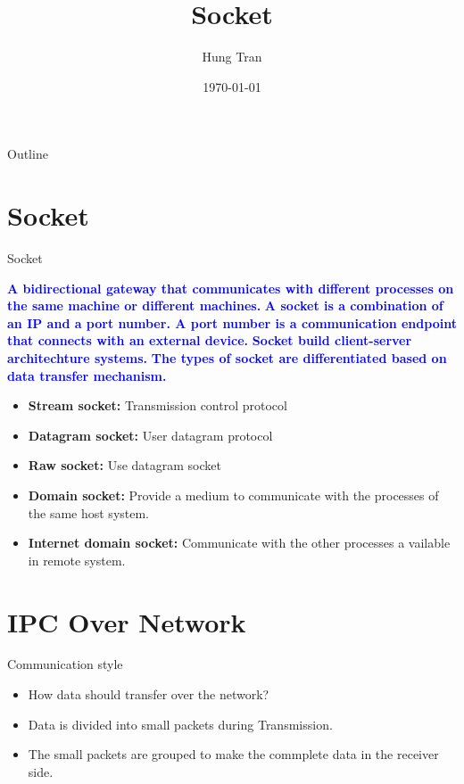 \documentclass[13pt]{beamer}
\title[IPCs]{Socket}
\author{Hung Tran}
\institute{Fpt software}
\date{\today}
\begin{document}
\begin{frame}
  \titlepage
\end{frame}

\begin{frame}{Outline}
  \tableofcontents
\end{frame}

\section{Socket}

\begin{frame}{Socket}
	\begin{center}
	\textcolor{blue}{\textbf{A bidirectional gateway that communicates with different processes on the same machine or different machines.}}
	\textcolor{blue}{\textbf{A socket is a combination of an IP and a port number. A port number is a communication endpoint that connects with an external device.}}
	\textcolor{blue}{\textbf{Socket build client-server architechture systems.}}
	\textcolor{blue}{\textbf{The types of socket are differentiated based on data transfer mechanism.}}
	\end{center}
	\begin{itemize}
		\setlength\itemsep{1em}
		\item \textbf{Stream socket: } Transmission control protocol
		\item \textbf{Datagram socket: } User datagram protocol
		\item \textbf{Raw socket: } Use datagram socket
		\item \textbf{Domain socket: } Provide a medium to communicate with the processes of the same host system.
		\item \textbf{Internet domain socket: } Communicate with the other processes a vailable in remote system.
	\end{itemize}
\end{frame}

\section{IPC Over Network}

\begin{frame}{Communication style}
	\begin{itemize}
		\item How data should transfer over the network?
		\item Data is divided into small packets during Transmission.
		\item The small packets are grouped to make the commplete data in the receiver side.
	\end{itemize}
\end{frame}
\end{document}
